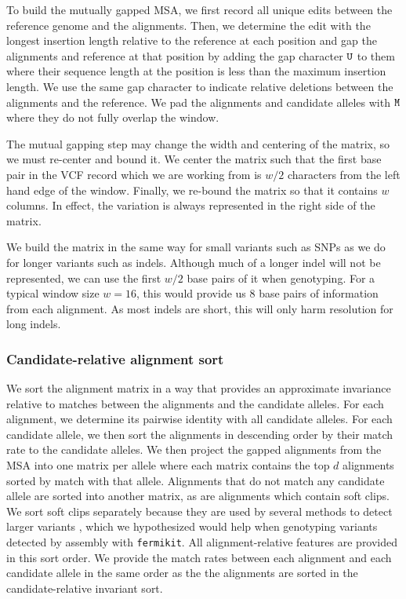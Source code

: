 \documentclass{article}
\begin{document}
To build the mutually gapped MSA, we first record all unique edits between the reference genome and the alignments.
Then, we determine the edit with the longest insertion length relative to the reference at each position and gap the alignments and reference at that position by adding the gap character ${\tt U}$ to them where their sequence length at the position is less than the maximum insertion length.
We use the same gap character to indicate relative deletions between the alignments and the reference.
We pad the alignments and candidate alleles with ${\tt M}$ where they do not fully overlap the window.

The mutual gapping step may change the width and centering of the matrix, so we must re-center and bound it.
We center the matrix such that the first base pair in the VCF record which we are working from is $w/2$ characters from the left hand edge of the window.
Finally, we re-bound the matrix so that it contains $w$ columns.
In effect, the variation is always represented in the right side of the matrix.

We build the matrix in the same way for small variants such as SNPs as we do for longer variants such as indels.
Although much of a longer indel will not be represented, we can use the first $w/2$ base pairs of it when genotyping.
For a typical window size $w = 16$, this would provide us 8 base pairs of information from each alignment.
As most indels are short, this will only harm resolution for long indels.

\subsubsection{Candidate-relative alignment sort}


We sort the alignment matrix in a way that provides an approximate invariance relative to matches between the alignments and the candidate alleles.
For each alignment, we determine its pairwise identity with all candidate alleles.
For each candidate allele, we then sort the alignments in descending order by their match rate to the candidate alleles.
We then project the gapped alignments from the MSA into one matrix per allele where each matrix contains the top $d$ alignments sorted by match with that allele.
Alignments that do not match any candidate allele are sorted into another matrix, as are alignments which contain soft clips.
We sort soft clips separately because they are used by several methods to detect larger variants \cite{kronenberg2015wham}, which we hypothesized would help when genotyping variants detected by assembly with {\tt fermikit}.
All alignment-relative features are provided in this sort order.
We provide the match rates between each alignment and each candidate allele in the same order as the the alignments are sorted in the candidate-relative invariant sort.
\end{document}
